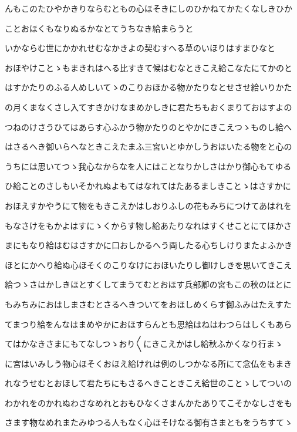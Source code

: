\documentclass[a4paper,11pt,landscape]{ltjtarticle}
\begin{document}
んもこのたひやかきりならむともの心ほそきにしのひかねてかたくなしきひか
\par\medskip
ことおほくもなりぬるかなとてうちなき給まらうと
\par\medskip
いかならむ世にかかれせむなかきよの契むすへる草のいほりはすまひなと
\par\medskip
おほやけことゝもまきれはへる比すきて候はむなときこえ給こなたにてかのと
\par\medskip
はすかたりのふる人めしいてゝのこりおほかる物かたりなとせさせ給いりかた
\par\medskip
の月くまなくさし入てすきかけなまめかしきに君たちもおくまりておはすよの
\par\medskip
つねのけさうひてはあらす心ふかう物かたりのとやかにきこえつゝものし給へ
\par\medskip
はさるへき御いらへなときこえたまふ三宮いとゆかしうおほいたる物をと心の
\par\medskip
うちには思いてつゝ我心なからなを人にはことなりかしさはかり御心もてゆる
\par\medskip
ひ給ことのさしもいそかれぬよもてはなれてはたあるましきことゝはさすかに
\par\medskip
おほえすかやうにて物をもきこえかはしおりふしの花もみちにつけてあはれを
\par\medskip
もなさけをもかよはすにゝくからす物し給あたりなれはすくせことにてほかさ
\par\medskip
まにもなり給はむはさすかに口おしかるへう両したる心ちしけりまたよふかき
\par\medskip
ほとにかへり給ぬ心ほそくのこりなけにおほいたりし御けしきを思いてきこえ
\par\medskip
給つゝさはかしきほとすくしてまうてむとおほす兵部卿の宮もこの秋のほとに
\par\medskip
もみちみにおはしまさむとさるへきついてをおほしめくらす御ふみはたえすた
\par\medskip
てまつり給をんなはまめやかにおほすらんとも思給はねはわつらはしくもあら
\par\medskip
てはかなきさまにもてなしつゝおり〱にきこえかはし給秋ふかくなり行まゝ
\par\medskip
に宮はいみしう物心ほそくおほえ給けれは例のしつかなる所にて念仏をもまき
\par\medskip
れなうせむとおほして君たちにもさるへきこときこえ給世のことゝしてついの
\par\medskip
わかれをのかれぬわさなめれとおもひなくさまんかたありてこそかなしさをも
\par\medskip
さます物なめれまたみゆつる人もなく心ほそけなる御有さまともをうちすてゝ
\end{document}
